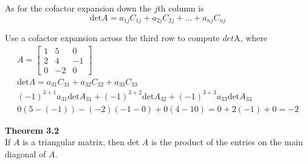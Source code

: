 \documentclass{article}
\begin{document}
  As for the cofactor expansion down the $ j $th column is
  \[
    \text{det}A = a_{1j}C_{1j}+a_{2j}C_{2j}+...+a_{nj}C_{nj}
  \]

  Use a cofactor expansion across the third row to compute $ det $A, where
  \[
    \begin{gathered}
    A= \begin{bmatrix}
      1 &5 &0\\
      2 &4 &-1\\
      0 &-2 &0
    \end{bmatrix}\\
    \text{det}A = a_{31}C_{31}+a_{32}C_{32}+a_{33}C_{33}\\
    (-1)^{3+1}a_{31}\text{det}A_{31}+(-1)^{3+2} \text{det}A_{32}+(-1)^{3+3}a_{33}\text{det}A_{33}\\
    0(5-(-1))-(-2)(-1-0)+0(4-10)=0+2(-1)+0=\boxed{-2}
    \end{gathered}
  \]

  \textbf{Theorem 3.2}\\
  If $ A $ is a triangular matrix, then det $ A $ is the product of the entries on the main diagonal of $ A $.   
\end{document}
